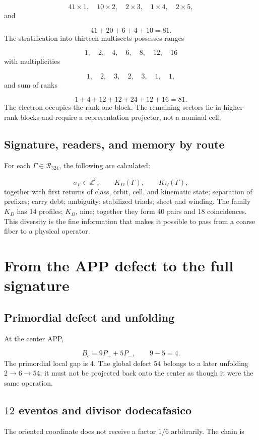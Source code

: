 \[
 41\times1,\quad10\times2,\quad2\times3,\quad1\times4,\quad2\times5,
\]
and

\[
 41+20+6+4+10=81.
\]
The stratification into thirteen multisects possesses ranges

\[
 1,\quad2,\quad4,\quad6,\quad8,\quad12,\quad16
\]
with multiplicities

\[
 1,\quad2,\quad3,\quad2,\quad3,\quad1,\quad1,
\]
and sum of ranks

\[
 1+4+12+12+24+12+16=81.
\]
The electron occupies the rank-one block. The remaining sectors lie in higher-rank blocks and require a representation projector, not a nominal cell.

\subsection{Signature, readers, and memory by route}
For each \(\Gamma\in\mathcal R_{324}\), the following are calculated:

\[
 \sigma_\Gamma\in\mathbb Z^5,\qquad
 K_D(\Gamma),\qquad K_\Omega(\Gamma),
\]
together with first returns of class, orbit, cell, and kinematic state; separation of prefixes; carry debt; ambiguity; stabilized triads; sheet and winding. The family \(K_D\) has 14 profiles; \(K_\Omega\), nine; together they form 40 pairs and 18 coincidences. This diversity is the fine information that makes it possible to pass from a coarse fiber to a physical operator.

\section{From the APP defect to the full signature}
\subsection{Primordial defect and unfolding}
At the center APP,

\[
 B_c=9P_++5P_-,\qquad 9-5=4.
\]
The primordial local gap is 4. The global defect \(54\) belongs to a later unfolding \(2\to6\to54\); it must not be projected back onto the center as though it were the same operation.

\subsection{\(12\) eventos and divisor dodecafasico}
The oriented coordinate does not receive a factor \(1/6\) arbitrarily. The chain is

